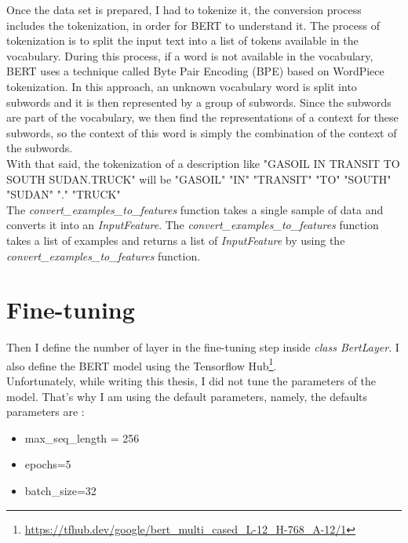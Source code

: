 Once the data set is prepared, I had to tokenize it, the conversion process includes the tokenization, in order for BERT to understand it. 
The process of tokenization is to split the input text into a list of tokens available in the vocabulary. During this process, if a word is not available in the vocabulary, BERT uses a technique called  Byte Pair Encoding (BPE) \cite{Sennrich2016} based on WordPiece \cite{Wu2016} tokenization. In this approach, an unknown vocabulary word is split into subwords and it is then represented by a group of subwords. Since the subwords are part of the vocabulary, we then find the representations of a context for these subwords, so the context of this word is simply the combination of the context of the subwords.\\

With that said, the tokenization of a description like "GASOIL IN TRANSIT TO SOUTH SUDAN.TRUCK" will be "GASOIL" "IN" "TRANSIT" "TO" "SOUTH" "SUDAN" "." "TRUCK"\\

The \textit{convert{\_}examples{\_}to{\_}features} function takes a single sample of data and converts it into an \textit{InputFeature}. The \textit{convert{\_}examples{\_}to{\_}features} function takes a list of examples and returns a list of \textit{InputFeature} by using the \textit{convert{\_}examples{\_}to{\_}features} function. 

\newpage
\section{Fine-tuning}

Then I define the number of layer in the fine-tuning step inside \textit{class BertLayer}. I also define the BERT model using the Tensorflow Hub\footnote{\url{https://tfhub.dev/google/bert_multi_cased_L-12_H-768_A-12/1}}.\\
Unfortunately, while writing this thesis, I did not tune the parameters of the model.
That's why I am using the default parameters, namely, the defaults parameters are :

\begin{itemize}
\item  max{\_}seq{\_}length = 256
\item  epochs=5
\item  batch{\_}size=32
\end{itemize}

